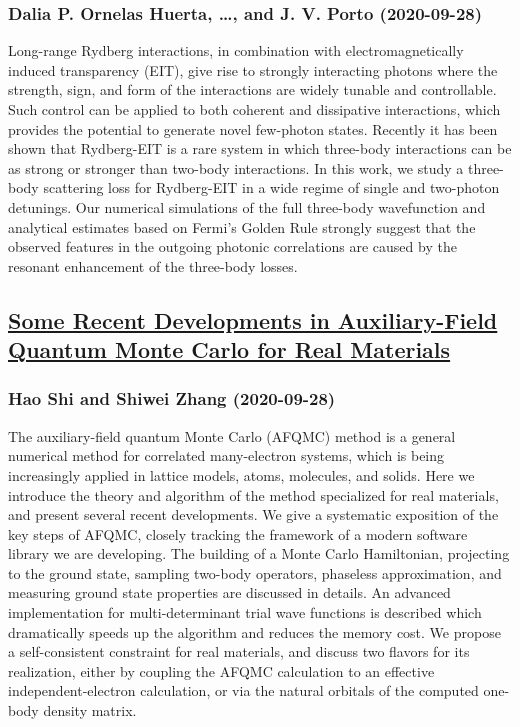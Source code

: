 \subsubsection*{Dalia P. Ornelas Huerta, \dots, and J. V. Porto (2020-09-28)}
Long-range Rydberg interactions, in combination with electromagnetically
induced transparency (EIT), give rise to strongly interacting photons where the
strength, sign, and form of the interactions are widely tunable and
controllable. Such control can be applied to both coherent and dissipative
interactions, which provides the potential to generate novel few-photon states.
Recently it has been shown that Rydberg-EIT is a rare system in which
three-body interactions can be as strong or stronger than two-body
interactions. In this work, we study a three-body scattering loss for
Rydberg-EIT in a wide regime of single and two-photon detunings. Our numerical
simulations of the full three-body wavefunction and analytical estimates based
on Fermi's Golden Rule strongly suggest that the observed features in the
outgoing photonic correlations are caused by the resonant enhancement of the
three-body losses.

\subsection*{\href{http://arxiv.org/abs/2009.13585v1}{Some Recent Developments in Auxiliary-Field Quantum Monte Carlo for Real  Materials}}
\subsubsection*{Hao Shi and Shiwei Zhang (2020-09-28)}
The auxiliary-field quantum Monte Carlo (AFQMC) method is a general numerical
method for correlated many-electron systems, which is being increasingly
applied in lattice models, atoms, molecules, and solids. Here we introduce the
theory and algorithm of the method specialized for real materials, and present
several recent developments. We give a systematic exposition of the key steps
of AFQMC, closely tracking the framework of a modern software library we are
developing. The building of a Monte Carlo Hamiltonian, projecting to the ground
state, sampling two-body operators, phaseless approximation, and measuring
ground state properties are discussed in details. An advanced implementation
for multi-determinant trial wave functions is described which dramatically
speeds up the algorithm and reduces the memory cost. We propose a
self-consistent constraint for real materials, and discuss two flavors for its
realization, either by coupling the AFQMC calculation to an effective
independent-electron calculation, or via the natural orbitals of the computed
one-body density matrix.

